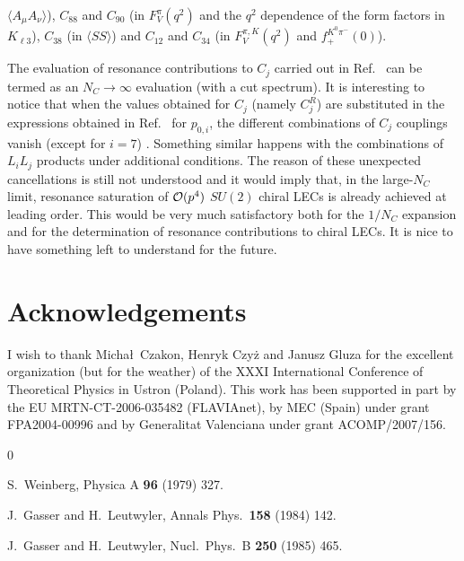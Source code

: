\documentclass{appolb}
\begin{document}
{$\langle A_{\mu}  A_{\nu} \rangle$), $C_{88}$ and $C_{90}$ (in $F_V^{\pi}(q^2)$ and the $q^2$ dependence of the
form factors in $K_{\ell 3}$), $C_{38}$ (in
$\langle SS \rangle$) and $C_{12}$ and $C_{34}$ (in $F_V^{\pi,K}(q^2)$ and $f_+^{K^0 \pi^-}(0)$). 
\par
The evaluation of resonance contributions to $C_j$ carried out in Ref.~\cite{Cirigliano:2006hb} can be
termed as an $N_C \rightarrow \infty$ evaluation (with a cut spectrum). It is interesting to notice that
when the values obtained for $C_j$ (namely $C_j^R$) are substituted in the expressions obtained in 
Ref.~\cite{Gasser:2007sg} for $p_{0,i}$, the different combinations of $C_j$ couplings vanish (except for $i=7$) \cite{christoph}. Something similar happens with the combinations of $L_i L_j$ products under additional conditions. The reason of these unexpected cancellations is still not understood and it would imply that, in the large-$N_C$ limit, resonance saturation of ${\cal O}(p^4)$ $SU(2)$ chiral LECs is already achieved at leading order. This would be very much satisfactory both for the $1/N_C$ expansion and for the determination of resonance contributions to chiral LECs. It is nice to have something left to understand for the future.

\section*{Acknowledgements}
I wish to thank Micha\l $\,$ Czakon, Henryk Czy\.z and Janusz Gluza for the excellent organization (but for the
weather) of the XXXI International Conference of Theoretical Physics in Ustron (Poland).
This work has been supported in part by the EU MRTN-CT-2006-035482 (FLAVIAnet), 
by MEC (Spain) under grant FPA2004-00996 and by Generalitat Valenciana under grant ACOMP/2007/156.

\begin{thebibliography}{0}

  S.~Weinberg,
  Physica A {\bf 96} (1979) 327.
  
  J.~Gasser and H.~Leutwyler,
  Annals Phys.\  {\bf 158} (1984) 142.
  
  J.~Gasser and H.~Leutwyler,
  Nucl.\ Phys.\  B {\bf 250} (1985) 465.


\end{thebibliography}}
\end{document}
